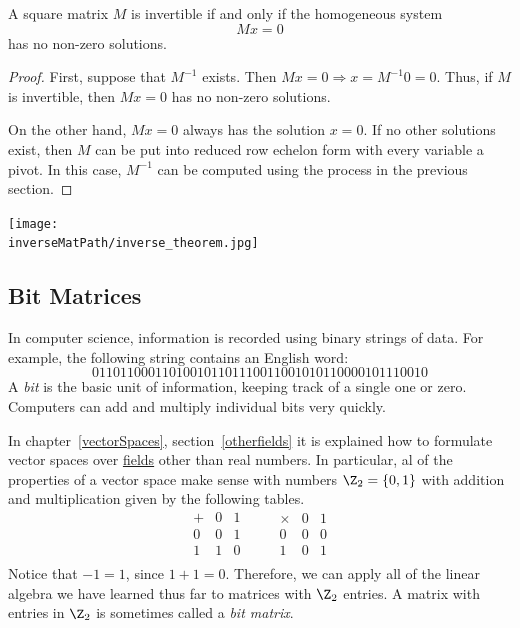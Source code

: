 \begin{theorem}
A square matrix $M$ is invertible if and only if the homogeneous system \[Mx=0\] has no non-zero solutions.
\end{theorem}

\begin{proof}
First, suppose that $M^{-1}$ exists.  Then $Mx=0 \Rightarrow x=M^{-1}0=0$.  Thus, if $M$ is invertible, then $Mx=0$ has no non-zero solutions.

On the other hand, $Mx=0$ always has the solution $x=0$.  If no other solutions exist, then $M$ can be put into reduced row echelon form with every variable a pivot.  In this case, $M^{-1}$ can be computed using the process in the previous section.
\end{proof}

\begin{center}
\texttt{[image: \\inverseMatPath/inverse\_theorem.jpg]}
\end{center}


\subsection{Bit Matrices}
In computer science, information is recorded using binary strings of data.  For example, the following string contains an English word:
\[
011011000110100101101110011001010110000101110010
\]
A \hypertarget{bits}{\emph{bit}} is the basic unit of information, keeping track of a single one or zero.  Computers can add and multiply individual bits very quickly.

In chapter~\ref{vectorSpaces}, section~\ref{otherfields} it is explained how to formulate vector spaces over \hyperref[fields]{fields} other than real numbers.
In particular, al of the properties of a 
vector space make sense with numbers $\Z_2=\{0,1 \}$ with addition and multiplication given by the following tables. 
\label{Z2}
\[
\begin{array}{c|cc}
+ & 0 & 1 \\ \hline
0 & 0 & 1 \\
1 & 1 & 0 \\
\end{array}
\qquad
\begin{array}{c|cc}
\times& 0 & 1 \\ \hline
0 & 0 & 0 \\
1 & 0 & 1 \\
\end{array}
\]
Notice that $-1=1$, since $1+1=0$.
Therefore,  we can apply all of the linear algebra we have learned thus far to matrices with $\Z_2$ entries.  A matrix with entries in $\Z_2$ is sometimes called a \emph{bit matrix}.

